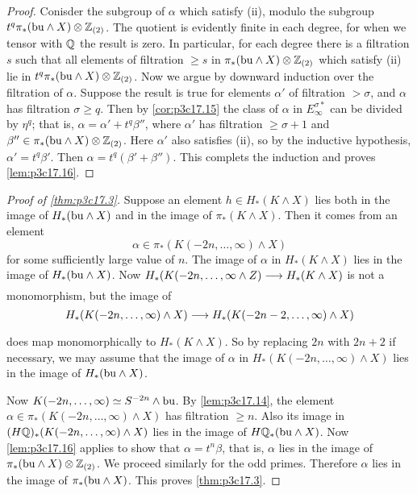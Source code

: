 \documentclass[../main]{subfiles}
\begin{document}
\begin{proof}
Conisder the subgroup of $\alpha$ which satisfy (ii), modulo the subgroup\newline $t^q \pi_\ast(\mathrm{bu} \wedge X) \otimes \mathbb{Z}_{(2)}$. The quotient is evidently finite in each degree, for when we tensor with $\mathbb{Q}$ the result is zero. In particular, for each degree there is a filtration $s$ such that all elements of filtration $\ge s$ in $\pi_\ast(\mathrm{bu} \wedge X) \otimes \mathbb{Z}_{(2)}$ which satisfy (ii) lie in $t^q \pi_\ast(\mathrm{bu} \wedge X) \otimes \mathbb{Z}_{(2)}$. Now we argue by downward induction over the filtration of $\alpha$. Suppose the result is true for elements $\alpha'$ of filtration $> \sigma$, and $\alpha$ has filtration $\sigma \ge q$. Then by \ref{cor:p3c17.15} the class of $\alpha$ in $E_\infty^{\sigma\ast}$ can be divided by $\eta^q$; that is, $\alpha = \alpha' + t^q \beta''$, where $\alpha'$ has filtration $\ge \sigma + 1$ and $\beta'' \in \pi_\ast(\mathrm{bu} \wedge X) \otimes \mathbb{Z}_{(2)}$. Here $\alpha'$ also satisfies (ii), so by the inductive hypothesis, $\alpha' = t^q \beta'$. Then $\alpha = t^q(\beta' + \beta'')$. This complets the induction and proves \ref{lem:p3c17.16}.
\end{proof}

\begin{proof}[Proof of \ref{thm:p3c17.3}]
Suppose an element $h \in H_\ast(K \wedge X)$ lies both in the image of $H_\ast(\mathrm{bu} \wedge X)$ and in the image of $\pi_\ast(K \wedge X)$. Then it comes from an element \[\alpha \in \pi_\ast(K(-2n, \ldots, \infty) \wedge X)\] for some sufficiently large value of $n$. The image of $\alpha$ in $H_\ast(K \wedge X)$ lies in the image of $H_\ast(\mathrm{bu} \wedge X)$. Now $H_\ast(K(-2n, \ldots, \infty \wedge Z) \lar{} H_\ast(K \wedge X)$ is not a monomorphism, but the image of \[H_\ast(K(-2n, \ldots, \infty) \wedge X) \lar{} H_\ast(K(-2n-2, \ldots, \infty) \wedge X)\] does map monomorphically to $H_\ast(K \wedge X)$. So by replacing $2n$ with $2n + 2$ if necessary, we may assume that the image of $\alpha$ in $H_\ast(K(-2n, \ldots, \infty) \wedge X)$ lies in the image of $H_\ast(\mathrm{bu} \wedge X)$.

Now $K(-2n, \ldots, \infty) \simeq S^{-2n} \wedge \mathrm{bu}$. By \ref{lem:p3c17.14}, the element \newline $\alpha \in \pi_\ast(K(-2n, \ldots, \infty) \wedge X)$ has filtration $\ge n$. Also its image in \newline $(H\mathbb{Q})_\ast(K(-2n, \ldots, \infty) \wedge X)$ lies in the image of $H\mathbb{Q}_\ast(\mathrm{bu} \wedge X)$. Now \ref{lem:p3c17.16} applies to show that $\alpha = t^n \beta$, that is, $\alpha$ lies in the image of $\pi_\ast(\mathrm{bu} \wedge X) \otimes \mathbb{Z}_{(2)}$. We proceed similarly for the odd primes. Therefore $\alpha$ lies in the image of $\pi_\ast(\mathrm{bu} \wedge X)$. This proves \ref{thm:p3c17.3}. 
\end{proof}
\end{document}
